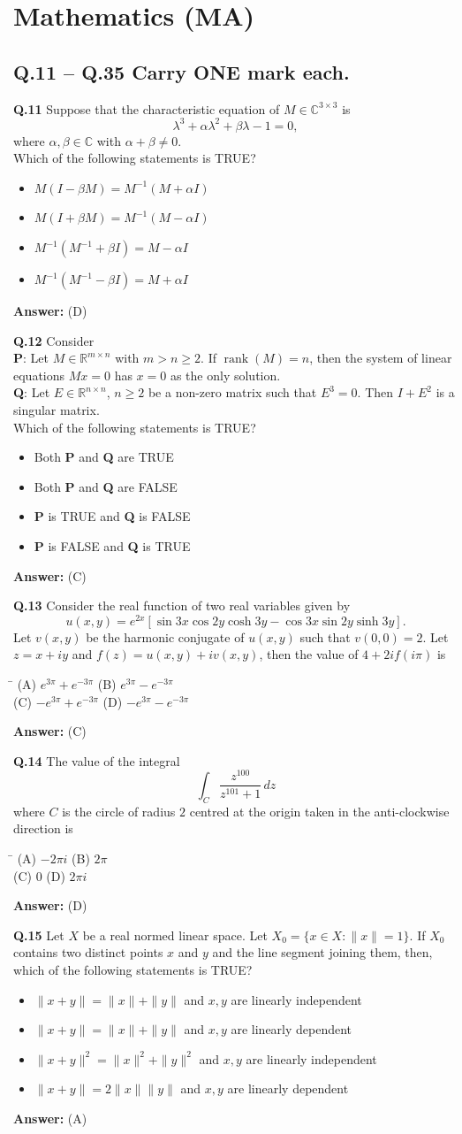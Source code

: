 \documentclass[11pt,a4paper]{article}
\newcommand{\optsfourA}[4]{%
  \begin{tabbing}
    \hspace{0.48\linewidth}\=\kill
    (A) #1 \> (B) #2 \\[2pt]
    (C) #3 \> (D) #4
  \end{tabbing}%
}
\newcommand{\optslistA}[4]{%
  \begin{itemize}
    \setlength{\itemsep}{2pt}\setlength{\parskip}{0pt}
    \item[(A)] #1
    \item[(B)] #2
    \item[(C)] #3
    \item[(D)] #4
  \end{itemize}%
}
\newcommand{\ans}[1]{\textbf{Answer:} #1\par\medskip}
\begin{document}
\section*{Mathematics (MA)}

\subsection*{Q.11 -- Q.35 Carry ONE mark each.}

\textbf{Q.11} Suppose that the characteristic equation of $M \in \mathbb{C}^{3 \times 3}$ is
\[
  \lambda^3 + \alpha \lambda^2 + \beta \lambda - 1 = 0,
\]
where $\alpha, \beta \in \mathbb{C}$ with $\alpha + \beta \neq 0$.\\
Which of the following statements is TRUE?
\optslistA{$M(I - \beta M) = M^{-1}(M + \alpha I)$}{$M(I + \beta M) = M^{-1}(M - \alpha I)$}{$M^{-1}(M^{-1} + \beta I) = M - \alpha I$}{$M^{-1}(M^{-1} - \beta I) = M + \alpha I$}
\ans{(D)}

\textbf{Q.12} Consider\\
\textbf{P}: Let $M \in \mathbb{R}^{m \times n}$ with $m > n \ge 2$. If $\operatorname{rank}(M) = n$, then the system of linear equations $Mx = 0$ has $x = 0$ as the only solution.\\
\textbf{Q}: Let $E \in \mathbb{R}^{n \times n}$, $n \ge 2$ be a non-zero matrix such that $E^3 = 0$. Then $I + E^2$ is a singular matrix.\\
Which of the following statements is TRUE?
\optslistA{Both \textbf{P} and \textbf{Q} are TRUE}{Both \textbf{P} and \textbf{Q} are FALSE}{\textbf{P} is TRUE and \textbf{Q} is FALSE}{\textbf{P} is FALSE and \textbf{Q} is TRUE}
\ans{(C)}

\textbf{Q.13} Consider the real function of two real variables given by
\[
  u(x, y) = e^{2x} \left[\sin 3x \cos 2y \cosh 3y - \cos 3x \sin 2y \sinh 3y\right].
\]
Let $v(x, y)$ be the harmonic conjugate of $u(x, y)$ such that $v(0, 0) = 2$. Let $z = x + iy$ and $f(z) = u(x, y) + iv(x, y)$, then the value of $4 + 2i f(i\pi)$ is
\optsfourA{$e^{3\pi} + e^{-3\pi}$}{$e^{3\pi} - e^{-3\pi}$}{$-e^{3\pi} + e^{-3\pi}$}{$-e^{3\pi} - e^{-3\pi}$}
\ans{(C)}

\textbf{Q.14} The value of the integral
\[
  \int_C \frac{z^{100}}{z^{101} + 1}\,dz
\]
where $C$ is the circle of radius $2$ centred at the origin taken in the anti-clockwise direction is
\optsfourA{$-2\pi i$}{$2\pi$}{$0$}{$2\pi i$}
\ans{(D)}

\textbf{Q.15} Let $X$ be a real normed linear space. Let $X_0 = \{x \in X : \|x\| = 1\}$. If $X_0$ contains two distinct points $x$ and $y$ and the line segment joining them, then, which of the following statements is TRUE?
\optslistA{$\|x + y\| = \|x\| + \|y\|$ and $x, y$ are linearly independent}{$\|x + y\| = \|x\| + \|y\|$ and $x, y$ are linearly dependent}{$\|x + y\|^2 = \|x\|^2 + \|y\|^2$ and $x, y$ are linearly independent}{$\|x + y\| = 2\|x\|\|y\|$ and $x, y$ are linearly dependent}
\ans{(A)}
\end{document}
